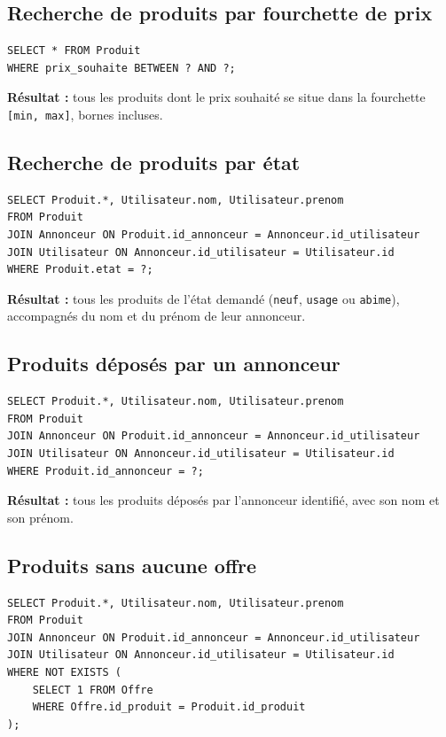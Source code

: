 \documentclass{article}
\theoremstyle{plain}
\theoremstyle{definition}
\begin{document}
\subsection*{Recherche de produits par fourchette de prix}
 
\begin{verbatim}
SELECT * FROM Produit
WHERE prix_souhaite BETWEEN ? AND ?;
\end{verbatim}
 
\noindent\textbf{Résultat :} tous les produits dont le prix souhaité se
situe dans la fourchette \texttt{[min, max]}, bornes incluses.
 
\subsection*{Recherche de produits par état}
 
\begin{verbatim}
SELECT Produit.*, Utilisateur.nom, Utilisateur.prenom
FROM Produit
JOIN Annonceur ON Produit.id_annonceur = Annonceur.id_utilisateur
JOIN Utilisateur ON Annonceur.id_utilisateur = Utilisateur.id
WHERE Produit.etat = ?;
\end{verbatim}
 
\noindent\textbf{Résultat :} tous les produits de l'état demandé
(\texttt{neuf}, \texttt{usage} ou \texttt{abime}), accompagnés du nom et
du prénom de leur annonceur.
 
\subsection*{Produits déposés par un annonceur}
 
\begin{verbatim}
SELECT Produit.*, Utilisateur.nom, Utilisateur.prenom
FROM Produit
JOIN Annonceur ON Produit.id_annonceur = Annonceur.id_utilisateur
JOIN Utilisateur ON Annonceur.id_utilisateur = Utilisateur.id
WHERE Produit.id_annonceur = ?;
\end{verbatim}
 
\noindent\textbf{Résultat :} tous les produits déposés par l'annonceur
identifié, avec son nom et son prénom.
 
\subsection*{Produits sans aucune offre}
 
\begin{verbatim}
SELECT Produit.*, Utilisateur.nom, Utilisateur.prenom
FROM Produit
JOIN Annonceur ON Produit.id_annonceur = Annonceur.id_utilisateur
JOIN Utilisateur ON Annonceur.id_utilisateur = Utilisateur.id
WHERE NOT EXISTS (
    SELECT 1 FROM Offre
    WHERE Offre.id_produit = Produit.id_produit
);
\end{verbatim}
 
\end{document}
